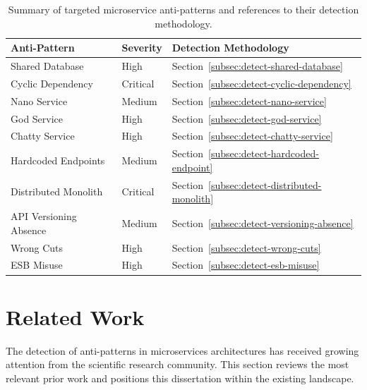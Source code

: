 \begin{table}[!ht]
    \begin{center}
        \begin{tabular}{|l|l|p{180pt}|}
            \hline
            \textbf{Anti-Pattern} & \textbf{Severity} & \textbf{Detection Methodology} \\
            \hline\hline
            Shared Database & High & Section~\ref{subsec:detect-shared-database} \\
            \hline
            Cyclic Dependency & Critical & Section~\ref{subsec:detect-cyclic-dependency} \\
            \hline
            Nano Service & Medium & Section~\ref{subsec:detect-nano-service} \\
            \hline
            God Service & High & Section~\ref{subsec:detect-god-service} \\
            \hline
            Chatty Service & High & Section~\ref{subsec:detect-chatty-service} \\
            \hline
            Hardcoded Endpoints & Medium & Section~\ref{subsec:detect-hardcoded-endpoint} \\
            \hline
            Distributed Monolith & Critical & Section~\ref{subsec:detect-distributed-monolith} \\
            \hline
            API Versioning Absence & Medium & Section~\ref{subsec:detect-versioning-absence} \\
            \hline
            Wrong Cuts & High & Section~\ref{subsec:detect-wrong-cuts} \\
            \hline
            ESB Misuse & High & Section~\ref{subsec:detect-esb-misuse} \\
            \hline
        \end{tabular}
    \end{center}
    \caption{Summary of targeted microservice anti-patterns and references to their detection methodology.}
    \label{tab:anti-patterns-summary}
\end{table}

\section{Related Work}
\label{sec:related-work}

\par The detection of anti-patterns in microservices architectures has received growing attention from the scientific research community. This section reviews the most relevant prior work and positions this dissertation within the existing landscape.


